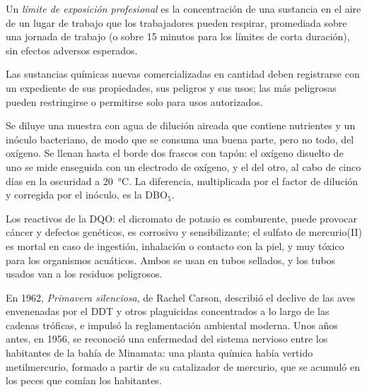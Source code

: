 \begin{definition}\label{def:b3:environmental-toxicology:oel}
Un \emph{límite de exposición profesional} es la
concentración de una sustancia en el aire de un lugar de trabajo que los trabajadores pueden respirar,
promediada sobre una jornada de trabajo (o sobre 15 minutos para los límites de corta duración), sin
efectos adversos esperados.
\end{definition}

Las sustancias químicas nuevas comercializadas en cantidad deben registrarse con un
expediente de sus propiedades, sus peligros y sus usos; las más peligrosas pueden
restringirse o permitirse solo para usos autorizados.

\begin{inthelab}
Se diluye una muestra con agua de dilución aireada que contiene nutrientes y un
inóculo bacteriano, de modo que se consuma una buena parte, pero no todo, del oxígeno. Se llenan
hasta el borde dos frascos con tapón: el oxígeno disuelto de uno se mide
enseguida con un electrodo de oxígeno, y el del otro, al cabo de cinco días en la oscuridad a
\qty{20}{\celsius}. La diferencia, multiplicada por el factor de dilución y corregida por el inóculo, es la
$\mathrm{DBO_5}$.
\end{inthelab}

\begin{safety}{}
Los reactivos de la DQO: el dicromato de potasio es comburente, puede provocar cáncer y
defectos genéticos, es corrosivo y sensibilizante; el sulfato de mercurio(II) es mortal en caso de
ingestión, inhalación o contacto con la piel, y muy tóxico para los organismos acuáticos. Ambos se
usan en tubos sellados, y los tubos usados van a los residuos peligrosos.
\end{safety}

\begin{history}
En 1962, \textit{Primavera silenciosa}, de Rachel Carson, describió el declive de las aves envenenadas por el
DDT y otros plaguicidas concentrados a lo largo de las cadenas tróficas, e impulsó la reglamentación
ambiental moderna. Unos años antes, en 1956, se reconoció una enfermedad del sistema
nervioso entre los habitantes de la bahía de Minamata: una planta química había
vertido metilmercurio, formado a partir de su catalizador de mercurio, que se acumuló
en los peces que comían los habitantes.
\end{history}

